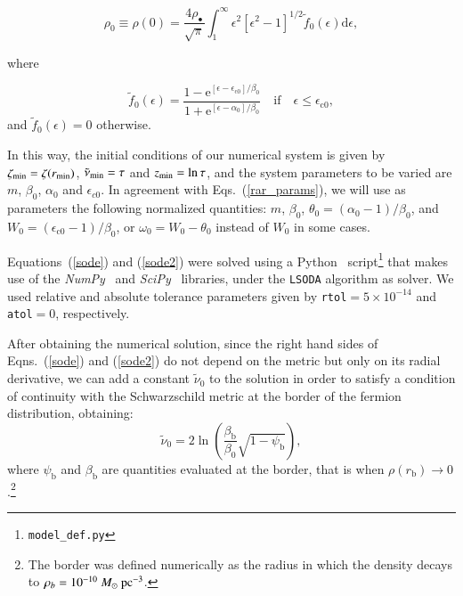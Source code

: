 \documentclass[twocolumn]{aa}
\begin{document}
\begin{appendix}
\begin{equation}
    \rho_0\equiv \rho(0) = \frac{4\rho_{\bullet}}{\sqrt{\pi}}\int^\infty_1\epsilon^2[\epsilon^2-1]^{1/2}\tilde{f}_0(\epsilon)\mathrm{d}\epsilon,
\end{equation}

where 

\begin{equation}
\tilde{f}_0(\epsilon)=
      \frac{1-\mathrm {e}^{[\epsilon-\epsilon_\mathrm{c0}]/\beta_0}}
      {1+\mathrm {e}^{[\epsilon-\alpha_0]/\beta_0}}\quad\mathrm{if}\quad \epsilon \leq \epsilon_\mathrm{c0}, 
\end{equation}
and $\tilde{f}_0(\epsilon)=0$ otherwise.

In this way, the initial conditions of our numerical system is given 
by $\zeta_{\rm{min}}=\zeta(r_{\rm{min}})$,
$\tilde{\nu}_{\rm{min}}=\tau$ and $z_{\rm{min}}=\ln{\tau}$, and the system parameters to be varied are $m$, $\beta_0$, $\alpha_0$ and $\epsilon_{c0}$. 
In agreement with Eqs.~(\ref{rar_params}), we will use as parameters the following normalized quantities: $m$, $\beta_0$, $\theta_0=(\alpha_0-1)/\beta_0$, and $W_0=(\epsilon_{\mathrm{c}0}-1)/\beta_0$, or $\omega_0=W_0-\theta_0$ instead of $W_0$ in some cases.

Equations~(\ref{sode}) and (\ref{sode2}) were solved using
a {\sc Python}~\citep{van1995python} script\footnote{\texttt{model\_def.py}}
that makes use of the {\it NumPy}~\citep{2020SciPy-NMeth} and {\it SciPy}~\citep{harris2020array} libraries, under the \texttt{LSODA} algorithm as solver.  We used relative and absolute tolerance parameters given by \texttt{rtol}$=5\times10^{-14}$ and \texttt{atol}$=0$, respectively.

After obtaining the numerical solution, since the right hand sides of Eqns.~(\ref{sode}) and (\ref{sode2}) do not depend on the metric but only on its radial derivative, we can add
a constant $\tilde{\nu}_0$ to the solution in order to satisfy a condition of continuity with the Schwarzschild metric at the border of the fermion distribution, obtaining:
\begin{equation}
\tilde{\nu}_0 = 2\ln\left(\frac{\beta_\mathrm{b}}{\beta_0}\sqrt{1-\psi_\mathrm{b}}\right),
\end{equation}
where $\psi_\mathrm{b}$ and $\beta_\mathrm{b}$ are quantities evaluated at the border, that is when 
$\rho(r_\mathrm{b})\rightarrow 0$.\footnote{The border was defined numerically as the radius in which
the density decays to $\rho_b=10^{-10}~M_\odot~\rm{pc}^{-3}$.}


\end{appendix}
\end{document}
